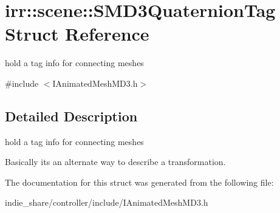 \hypertarget{structirr_1_1scene_1_1SMD3QuaternionTag}{}\section{irr\+:\+:scene\+:\+:S\+M\+D3\+Quaternion\+Tag Struct Reference}
\label{structirr_1_1scene_1_1SMD3QuaternionTag}


hold a tag info for connecting meshes  




{\ttfamily \#include $<$I\+Animated\+Mesh\+M\+D3.\+h$>$}



\subsection{Detailed Description}
hold a tag info for connecting meshes 

Basically its an alternate way to describe a transformation. 

The documentation for this struct was generated from the following file\+:\begin{DoxyCompactItemize}
\item 
indie\+\_\+share/controller/include/I\+Animated\+Mesh\+M\+D3.\+h\end{DoxyCompactItemize}
